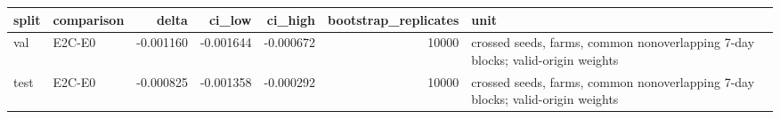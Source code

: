 \begin{tabular}{llrrrrl}
\toprule
split & comparison & delta & ci\_low & ci\_high & bootstrap\_replicates & unit \\
\midrule
val & E2C-E0 & -0.001160 & -0.001644 & -0.000672 & 10000 & crossed seeds, farms, common nonoverlapping 7-day blocks; valid-origin weights \\
test & E2C-E0 & -0.000825 & -0.001358 & -0.000292 & 10000 & crossed seeds, farms, common nonoverlapping 7-day blocks; valid-origin weights \\
\bottomrule
\end{tabular}
